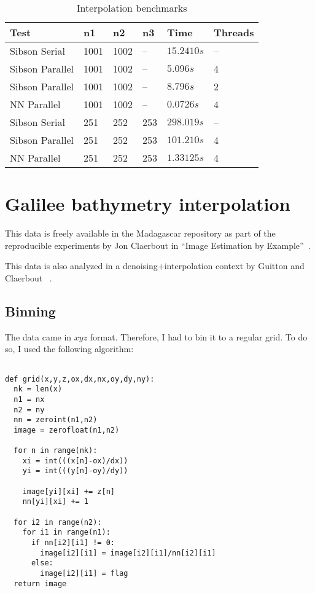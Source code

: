 \documentclass[10pt]{article}
\begin{document}
\begin{table}
\centering
    \begin{tabular}{  |l | l | l | l | l | l |}
    \hline
      Test             & n1   &  n2  & n3  &  Time       & Threads \\ \hline
      Sibson Serial    & 1001 & 1002 & --  & $15.2410s$  &  --     \\ 
      Sibson Parallel  & 1001 & 1002 & --  & $ 5.096s$   &  4      \\ 
      Sibson Parallel  & 1001 & 1002 & --  & $ 8.796s$   &  2      \\ 
      NN Parallel      & 1001 & 1002 & --  & $ 0.0726s$  &  4      \\ 
      Sibson Serial    & 251  & 252  & 253 & $298.019s$  &  --     \\ 
      Sibson Parallel  & 251  & 252  & 253 & $101.210s$  &  4      \\ 
      NN Parallel      & 251  & 252  & 253 & $1.33125s$  &  4      \\ 
    \hline
    \end{tabular}
    \caption{ Interpolation benchmarks}
    \label{tab:2dbench}
\end{table}



\section{Galilee bathymetry interpolation}
This data is freely available in the Madagascar repository as part
of the reproducible experiments by Jon Claerbout in ``Image Estimation by
 Example''~\cite{claerbout_gee}. 

This data is also analyzed in a denoising+interpolation context by Guitton and Claerbout
~\cite{guitton_galilee}.

\subsection{Binning}
The data came in $xyz$ format. Therefore, I had to bin it to a regular grid.  To do so,
I used the following algorithm:

\begin{program}[h!]
\begin{verbatim}

def grid(x,y,z,ox,dx,nx,oy,dy,ny):
  nk = len(x)
  n1 = nx
  n2 = ny
  nn = zeroint(n1,n2)
  image = zerofloat(n1,n2)

  for n in range(nk):
    xi = int(((x[n]-ox)/dx)) 
    yi = int(((y[n]-oy)/dy)) 
      
    image[yi][xi] += z[n]  
    nn[yi][xi] += 1

  for i2 in range(n2):
    for i1 in range(n1):
      if nn[i2][i1] != 0:
        image[i2][i1] = image[i2][i1]/nn[i2][i1]
      else:
        image[i2][i1] = flag
  return image
\end{verbatim}
  \caption{Scattered data binning}
  \label{code:bin}
\end{program}
\end{document}
